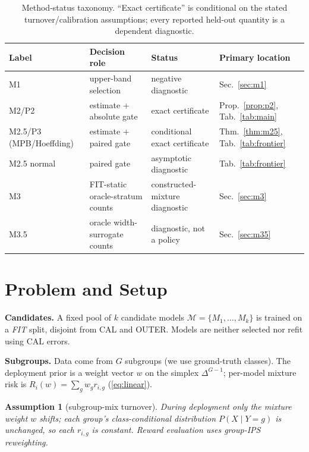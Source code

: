 \documentclass{article}
\newtheorem{assumption}{Assumption}
\begin{document}
\FloatBarrier
\begin{table}[t]
\centering\footnotesize\setlength{\tabcolsep}{1pt}
\begin{tabular}{llll}
\toprule
Label & Decision role & Status & Primary location \\
\midrule
M1 & upper-band selection & negative diagnostic & Sec.~\ref{sec:m1} \\
M2/P2 & estimate + absolute gate & exact certificate & Prop.~\ref{prop:p2}, Tab.~\ref{tab:main} \\
M2.5/P3 (MPB/Hoeffding) & estimate + paired gate & conditional exact certificate & Thm.~\ref{thm:m25}, Tab.~\ref{tab:frontier} \\
M2.5 normal & paired gate & asymptotic diagnostic & Tab.~\ref{tab:frontier} \\
M3 & FIT-static oracle-stratum counts & constructed-mixture diagnostic & Sec.~\ref{sec:m3} \\
M3.5 & oracle width-surrogate counts & diagnostic, not a policy & Sec.~\ref{sec:m35} \\
\bottomrule
\end{tabular}
\caption{Method-status taxonomy. ``Exact certificate'' is conditional on the stated
turnover/calibration assumptions; every reported held-out quantity is a dependent diagnostic.}
\label{tab:taxonomy}
\end{table}

\section{Problem and Setup}
\label{sec:setup}

\textbf{Candidates.} A fixed pool of $k$ candidate models $\mathcal{M}=\{M_1,\dots,M_k\}$
is trained on a \emph{FIT} split, disjoint from CAL and OUTER. Models are neither selected nor
refit using CAL errors.

\textbf{Subgroups.} Data come from $G$ subgroups (we use ground-truth classes). The
deployment prior is a weight vector $w$ on the simplex $\Delta^{G-1}$; per-model mixture
risk is $R_i(w)=\sum_g w_g r_{i,g}$ (\eqref{eq:linear}).

\begin{assumption}[subgroup-mix turnover]
\label{ass:turnover}
During deployment only the mixture weight $w$ shifts; each group's class-conditional
distribution $P(X\mid Y{=}g)$ is unchanged, so each $r_{i,g}$ is constant. Reward
evaluation uses group-IPS reweighting.
\end{assumption}
\end{document}
